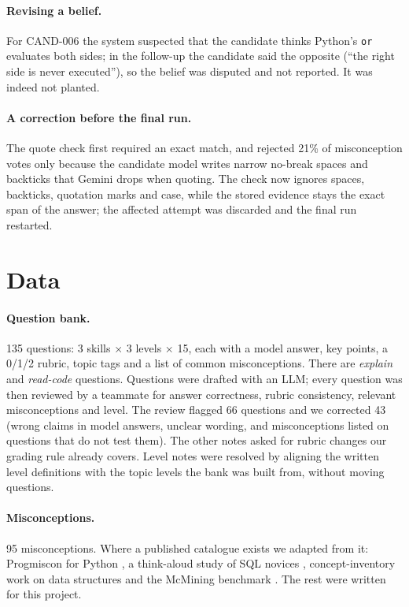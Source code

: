 \documentclass[10pt,a4paper]{article}
\begin{document}
\paragraph{Revising a belief.} For CAND-006 the system suspected that the candidate thinks Python's
\texttt{or} evaluates both sides; in the follow-up the candidate said the opposite (``the right side is
never executed''), so the belief was disputed and not reported. It was indeed not planted.

\paragraph{A correction before the final run.} The quote check first required an exact match, and
rejected 21\% of misconception votes only because the candidate model writes narrow no-break spaces
and backticks that Gemini drops when quoting. The check now ignores spaces, backticks, quotation marks
and case, while the stored evidence stays the exact span of the answer; the affected attempt was
discarded and the final run restarted.

\section{Data}

\paragraph{Question bank.} 135 questions: 3 skills $\times$ 3 levels $\times$ 15, each with a model
answer, key points, a 0/1/2 rubric, topic tags and a list of common misconceptions. There are
\emph{explain} and \emph{read-code} questions. Questions were drafted with an LLM; every question was
then reviewed by a teammate for answer correctness, rubric consistency, relevant misconceptions and
level. The review flagged 66 questions and we corrected 43 (wrong claims in model answers, unclear
wording, and misconceptions listed on questions that do not test them). The other notes asked for
rubric changes our grading rule already covers. Level notes were resolved by aligning the written
level definitions with the topic levels the bank was built from, without moving questions.

\paragraph{Misconceptions.} 95 misconceptions. Where a published catalogue exists we adapted from
it: Progmiscon for Python \cite{chiodini2021}, a think-aloud study of SQL novices
\cite{miedema2021}, concept-inventory work on data structures \cite{karpierz2014} and the McMining
benchmark \cite{alhossami2025}. The rest were written for this project.
\end{document}

